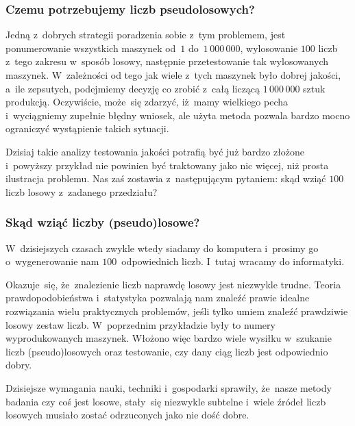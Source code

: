 \documentclass[10pt,t]{beamer}
\begin{document}
\begin{frame}
  \frametitle{Czemu potrzebujemy liczb pseudolosowych?}


  Jedną z~dobrych strategii poradzenia sobie z~tym problemem, jest
  ponumerowanie wszystkich maszynek od~$1$ do~$1 \, 000 \, 000$, wylosowanie
  $100$ liczb z~tego zakresu w~sposób losowy, następnie przetestowanie
  tak wylosowanych maszynek. W~zależności od tego jak wiele z~tych maszynek
  było dobrej jakości, a~ile zepsutych, podejmiemy decyzję co zrobić
  z~całą liczącą $1 \, 000 \, 000$ sztuk produkcją. Oczywiście, może~się
  zdarzyć, iż~mamy wielkiego pecha i~wyciągniemy zupełnie błędny wniosek,
  ale użyta metoda pozwala bardzo mocno ograniczyć wystąpienie takich
  sytuacji.

  Dzisiaj takie analizy testowania jakości potrafią być już bardzo złożone
  i~powyższy przykład nie powinien być traktowany jako nic więcej, niż
  prosta ilustracja problemu. Nas zaś zostawia z~następującym pytaniem: skąd
  wziąć $100$ liczb losowy z~zadanego przedziału?

\end{frame}





\begin{frame}
  \frametitle{Skąd wziąć liczby (pseudo)losowe?}


  W~dzisiejszych czasach zwykle wtedy siadamy do komputera i~prosimy go
  o~wygenerowanie nam $100$~odpowiednich liczb. I~tutaj wracamy do
  informatyki.

  Okazuje~się, że~znalezienie liczb naprawdę losowy jest niezwykle trudne.
  Teoria prawdopodobieństwa i~statystyka pozwalają nam znaleźć prawie
  idealne rozwiązania wielu praktycznych problemów, jeśli tylko umiem
  znaleźć prawdziwie losowy zestaw liczb. W~poprzednim przykładzie były to
  numery wyprodukowanych maszynek. Włożono więc bardzo wiele wysiłku
  w~szukanie liczb (pseudo)losowych oraz testowanie, czy dany ciąg liczb
  jest odpowiednio dobry.

  Dzisiejsze wymagania nauki, techniki i~gospodarki sprawiły, że~nasze metody
  badania czy coś jest losowe, stały~się niezwykle subtelne i~wiele źródeł
  liczb losowych musiało zostać odrzuconych jako nie dość dobre.

\end{frame}
\end{document}
